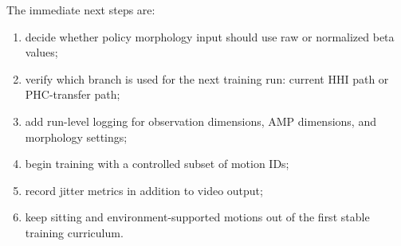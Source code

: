 \documentclass[11pt,a4paper]{article}
\begin{document}
The immediate next steps are:

\begin{enumerate}[leftmargin=2em]
    \item decide whether policy morphology input should use raw or normalized beta values;
    \item verify which branch is used for the next training run: current HHI path or PHC-transfer path;
    \item add run-level logging for observation dimensions, AMP dimensions, and morphology settings;
    \item begin training with a controlled subset of motion IDs;
    \item record jitter metrics in addition to video output;
    \item keep sitting and environment-supported motions out of the first stable training curriculum.
\end{enumerate}
\end{document}
